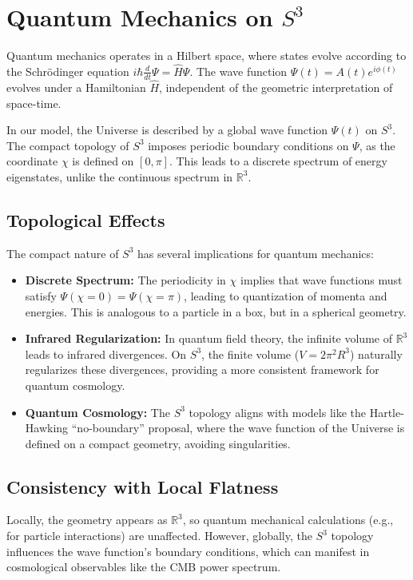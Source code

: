 \documentclass[12pt]{article}
\begin{document}
\section{Quantum Mechanics on \(S^3\)}

Quantum mechanics operates in a Hilbert space, where states evolve according to the Schrödinger equation \(i\hbar \frac{d}{dt}\Psi = \hat{H}\Psi\). The wave function \(\Psi(t) = A(t)e^{i\phi(t)}\) evolves under a Hamiltonian \(\hat{H}\), independent of the geometric interpretation of space-time.

In our model, the Universe is described by a global wave function \(\Psi(t)\) on \(S^3\). The compact topology of \(S^3\) imposes periodic boundary conditions on \(\Psi\), as the coordinate \(\chi\) is defined on \([0,\pi]\). This leads to a discrete spectrum of energy eigenstates, unlike the continuous spectrum in \(\mathbb{R}^3\).

\subsection{Topological Effects}

The compact nature of \(S^3\) has several implications for quantum mechanics:
\begin{itemize}
\item \textbf{Discrete Spectrum:} The periodicity in \(\chi\) implies that wave functions must satisfy \(\Psi(\chi = 0) = \Psi(\chi = \pi)\), leading to quantization of momenta and energies. This is analogous to a particle in a box, but in a spherical geometry.
\item \textbf{Infrared Regularization:} In quantum field theory, the infinite volume of \(\mathbb{R}^3\) leads to infrared divergences. On \(S^3\), the finite volume (\(V = 2\pi^2 R^3\)) naturally regularizes these divergences, providing a more consistent framework for quantum cosmology.
\item \textbf{Quantum Cosmology:} The \(S^3\) topology aligns with models like the Hartle-Hawking ``no-boundary'' proposal, where the wave function of the Universe is defined on a compact geometry, avoiding singularities.
\end{itemize}

\subsection{Consistency with Local Flatness}

Locally, the geometry appears as \(\mathbb{R}^3\), so quantum mechanical calculations (e.g., for particle interactions) are unaffected. However, globally, the \(S^3\) topology influences the wave function's boundary conditions, which can manifest in cosmological observables like the CMB power spectrum.
\end{document}
